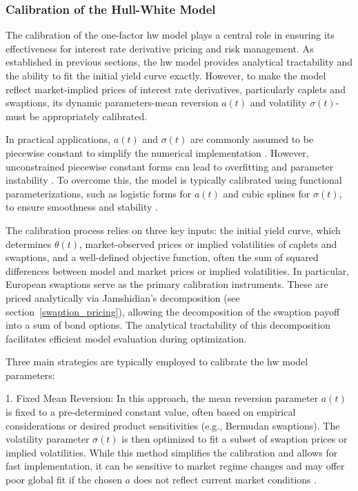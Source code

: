 \subsubsection{Calibration of the Hull-White Model}
\label{calibration}
The calibration of the one-factor \ac{hw} model plays a central role in ensuring its effectiveness for interest rate derivative pricing and risk management. As established in previous sections, the \ac{hw} model provides analytical tractability and the ability to fit the initial yield curve exactly. However, to make the model reflect market-implied prices of interest rate derivatives, particularly caplets and swaptions, its dynamic parameters-mean reversion $a(t)$ and volatility $\sigma(t)$-must be appropriately calibrated.

In practical applications, $a(t)$ and $\sigma(t)$ are commonly assumed to be piecewise constant to simplify the numerical implementation \parencite[p.~7]{gurrieri2009calibration}. However, unconstrained piecewise constant forms can lead to overfitting and parameter instability \parencite[p.~2]{gurrieri2009calibration}. To overcome this, the model is typically calibrated using functional parameterizations, such as logistic forms for $a(t)$ and cubic splines for $\sigma(t)$, to ensure smoothness and stability \parencite[p.~8]{gurrieri2009calibration}.

The calibration process relies on three key inputs: the initial yield curve, which determines $\theta(t)$, market-observed prices or implied volatilities of caplets and swaptions, and a well-defined objective function, often the sum of squared differences between model and market prices or implied volatilities. In particular, European swaptions serve as the primary calibration instruments. These are priced analytically via Jamshidian's decomposition (see section~\ref{swaption_pricing}), allowing the decomposition of the swaption payoff into a sum of bond options. The analytical tractability of this decomposition facilitates efficient model evaluation during optimization.

Three main strategies are typically employed to calibrate the \ac{hw} model parameters:

1. Fixed Mean Reversion: In this approach, the mean reversion parameter $a(t)$ is fixed to a pre-determined constant value, often based on empirical considerations or desired product sensitivities (e.g., Bermudan swaptions). The volatility parameter $\sigma(t)$ is then optimized to fit a subset of swaption prices or implied volatilities. While this method simplifies the calibration and allows for fast implementation, it can be sensitive to market regime changes and may offer poor global fit if the chosen $a$ does not reflect current market conditions \parencite[p.~13]{gurrieri2009calibration}.


